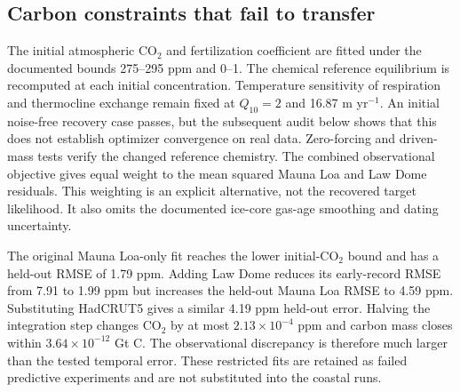 \subsection{Carbon constraints that fail to transfer}
The initial atmospheric CO$_2$ and fertilization coefficient are fitted under
the documented bounds 275--295 ppm and 0--1. The chemical reference equilibrium
is recomputed at each initial concentration. Temperature sensitivity of
respiration and thermocline exchange remain fixed at $Q_{10}=2$ and
16.87 m yr$^{-1}$. An initial noise-free recovery case passes, but the subsequent audit below
shows that this does not establish optimizer convergence on real data.
Zero-forcing and driven-mass tests verify the changed reference chemistry.
The combined observational objective gives equal weight to the mean squared
Mauna Loa and Law Dome residuals. This weighting is an explicit alternative,
not the recovered target likelihood. It also omits the documented ice-core
gas-age smoothing and dating uncertainty.

The original Mauna Loa-only fit reaches the lower initial-CO$_2$ bound and has a held-out
RMSE of 1.79 ppm. Adding Law Dome reduces its early-record RMSE from 7.91 to
1.99 ppm but increases the held-out Mauna Loa RMSE to 4.59 ppm. Substituting
HadCRUT5 gives a similar 4.19 ppm held-out error. Halving the integration step
changes CO$_2$ by at most $2.13\times10^{-4}$ ppm and carbon mass closes within
$3.64\times10^{-12}$ Gt C. The observational discrepancy is therefore much
larger than the tested temporal error. These restricted fits are retained as
failed predictive experiments and are not substituted into the coastal runs.

